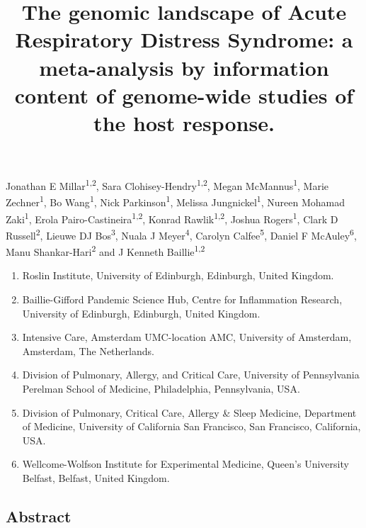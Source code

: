 \documentclass[
  11,
  a4paper,
]{article}
\title{The genomic landscape of Acute Respiratory Distress Syndrome: a
meta-analysis by information content of genome-wide studies of the host
response.}
\author{}
\date{}
\providecommand{\tightlist}{%
  \setlength{\itemsep}{0pt}\setlength{\parskip}{0pt}}\usepackage{longtable,booktabs,array}
\begin{document}
\maketitle
\ifdefined\Shaded\renewenvironment{Shaded}{\begin{tcolorbox}[breakable, interior hidden, borderline west={3pt}{0pt}{shadecolor}, enhanced, sharp corners, boxrule=0pt, frame hidden]}{\end{tcolorbox}}\fi

Jonathan E Millar\textsuperscript{1,2}, Sara
Clohisey-Hendry\textsuperscript{1,2}, Megan McMannus\textsuperscript{1},
Marie Zechner\textsuperscript{1}, Bo Wang\textsuperscript{1}, Nick
Parkinson\textsuperscript{1}, Melissa Jungnickel\textsuperscript{1},
Nureen Mohamad Zaki\textsuperscript{1}, Erola
Pairo-Castineira\textsuperscript{1,2}, Konrad
Rawlik\textsuperscript{1,2}, Joshua Rogers\textsuperscript{1}, Clark D
Russell\textsuperscript{2}, Lieuwe DJ Bos\textsuperscript{3}, Nuala J
Meyer\textsuperscript{4}, Carolyn Calfee\textsuperscript{5}, Daniel F
McAuley\textsuperscript{6}, Manu Shankar-Hari\textsuperscript{2} and J
Kenneth Baillie\textsuperscript{1,2}

\begin{enumerate}
\def\labelenumi{\arabic{enumi}.}
\tightlist
\item
  Roslin Institute, University of Edinburgh, Edinburgh, United Kingdom.
\item
  Baillie-Gifford Pandemic Science Hub, Centre for Inflammation
  Research, University of Edinburgh, Edinburgh, United Kingdom.
\item
  Intensive Care, Amsterdam UMC-location AMC, University of Amsterdam,
  Amsterdam, The Netherlands.
\item
  Division of Pulmonary, Allergy, and Critical Care, University of
  Pennsylvania Perelman School of Medicine, Philadelphia, Pennsylvania,
  USA.
\item
  Division of Pulmonary, Critical Care, Allergy \& Sleep Medicine,
  Department of Medicine, University of California San Francisco, San
  Francisco, California, USA.
\item
  Wellcome-Wolfson Institute for Experimental Medicine, Queen's
  University Belfast, Belfast, United Kingdom.
\end{enumerate}

\newpage

\hypertarget{abstract}{%
\subsection{Abstract}\label{abstract}}
\end{document}
